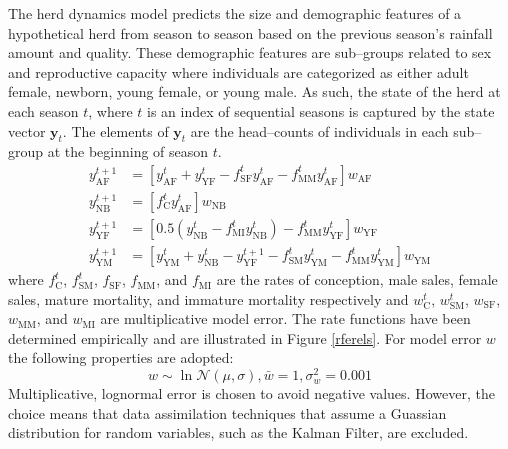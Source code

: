 \documentclass[fleqn, letterpaper]{amsart}
\newcommand{\vecy}{\mathbf{y}}
\begin{document}
The herd dynamics model predicts the size and demographic features of a hypothetical herd from season to season based on the previous season's rainfall amount and quality.
These demographic features are sub--groups related to sex and reproductive capacity where individuals are categorized as either adult female, newborn, young female, or young male.
As such, the state of the herd at each season $t$, where $t$ is an index of sequential seasons is captured by the state vector $\vecy_t$.
The elements of $\vecy_t$ are the head--counts of individuals in each sub--group at the beginning of season $t$.
\begin{align}
y_{\text{AF}}^{t+1} &= [y_{\text{AF}}^t + y_{\text{YF}}^t - f_{\text{SF}}^ty_{\text{AF}}^t - f_{\text{MM}}^ty_{\text{AF}}^t]w_{\text{AF}}\\
y_{\text{NB}}^{t+1} &= [f_{\text{C}}^ty_{\text{AF}}^t]w_{\text{NB}}\\
y_{\text{YF}}^{t+1} &= [0.5(y_{\text{NB}}^t - f_{\text{MI}}^ty_{\text{NB}}^t) - f_{\text{MM}}^ty_{\text{YF}}^t]w_{\text{YF}}\\
y_{\text{YM}}^{t+1} &= [y_{\text{YM}}^t + y_{\text{NB}}^t - y_{\text{YF}}^{t+1} - f_{\text{SM}}^ty_{\text{YM}}^t - f_{\text{MM}}^ty_{\text{YM}}^t]w_{\text{YM}}
\end{align}
where $f_{\text{C}}^t$, $f_{\text{SM}}^t$, $f_{\text{SF}}$, $f_{\text{MM}}$, and $f_{\text{MI}}$ are the rates of conception, male sales, female sales, mature mortality, and immature mortality respectively and
$w_{\text{C}}^t$, $w_{\text{SM}}^t$, $w_{\text{SF}}$, $w_{\text{MM}}$, and $w_{\text{MI}}$
are multiplicative model error.
The rate functions have been determined empirically and are illustrated in Figure \ref{rferels}.
For model error $w$ the following properties are adopted:
\[w\sim\ln\mathcal{N}(\mu,\sigma), \bar{w}=1, \sigma_w^2 = 0.001\]
Multiplicative, lognormal error is chosen to avoid negative values.
However, the choice means that data assimilation techniques that assume a Guassian distribution for random variables, such as the Kalman Filter, are excluded.
\end{document}
